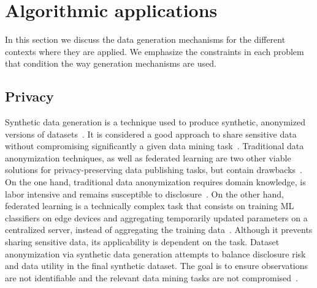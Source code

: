 \documentclass[parskip=full]{scrartcl}
\begin{document}
% 
% 
% 
% 

\section{Algorithmic applications}\label{sec:algorithmic-applications}


In this section we discuss the data generation mechanisms for the different
contexts where they are applied. We emphasize the constraints in each problem
that condition the way generation mechanisms are used.

\subsection{Privacy}\label{sec:data-privacy}

Synthetic data generation is a technique used to produce synthetic, anonymized
versions of datasets~\cite{dankar2021fake}. It is considered a good approach
to share sensitive data without compromising significantly a given data mining
task~\cite{taub2018differential, park2018data}. Traditional data anonymization
techniques, as well as federated learning are two other viable solutions for
privacy-preserving data publishing tasks, but contain
drawbacks~\cite{hernandez2022synthetic}. On the one hand, traditional data
anonymization requires domain knowledge, is labor intensive and remains
susceptible to disclosure~\cite{reiter2004new}. On the other hand, federated
learning is a technically complex task that consists on training ML
classifiers on edge devices and aggregating temporarily updated parameters on
a centralized server, instead of aggregating the training
data~\cite{yu2022survey}. Although it prevents sharing sensitive data, its
applicability is dependent on the task. Dataset anonymization via synthetic
data generation attempts to balance disclosure risk and data utility in the
final synthetic dataset. The goal is to ensure observations are not
identifiable and the relevant data mining tasks are not
compromised~\cite{singh2017aggregating, li2018privacy}.
\end{document}
